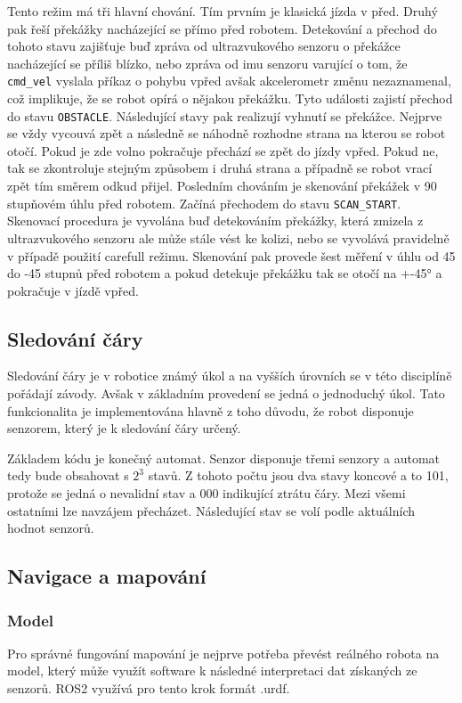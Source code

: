 Tento režim má tři hlavní chování. Tím prvním je klasická jízda v před. 
Druhý pak řeší překážky nacházející se přímo před robotem. Detekování a přechod do tohoto stavu zajišťuje buď zpráva od ultrazvukového senzoru o překážce nacházející se příliš blízko, nebo zpráva od imu senzoru varující o tom, že \verb|cmd_vel| vyslala příkaz o pohybu vpřed avšak akcelerometr změnu nezaznamenal, což implikuje, že se robot opírá o nějakou překážku. Tyto události zajistí přechod do stavu \verb|OBSTACLE|. Následující stavy pak realizují vyhnutí se překážce. Nejprve se vždy vycouvá zpět a následně se náhodně rozhodne strana na kterou se robot otočí. Pokud je zde volno pokračuje přechází se zpět do jízdy vpřed. Pokud ne, tak se zkontroluje stejným způsobem i druhá strana a případně se robot vrací zpět tím směrem odkud přijel.
Posledním chováním je skenování překážek v 90 stupňovém úhlu před robotem. Začíná přechodem do stavu \verb|SCAN_START|. Skenovací procedura je vyvolána buď detekováním překážky, která zmizela z ultrazvukového senzoru ale může stále vést ke kolizi, nebo se vyvolává pravidelně v případě použití carefull režimu. Skenování pak provede šest měření v úhlu od 45 do -45 stupnů před robotem a pokud detekuje překážku tak se otočí na +-45° a pokračuje v jízdě vpřed.

\subsection*{Sledování čáry}
Sledování čáry je v robotice známý úkol a na vyšších úrovních se v této disciplíně pořádají závody. Avšak v základním provedení se jedná o jednoduchý úkol. Tato funkcionalita je implementována hlavně z toho důvodu, že robot disponuje senzorem, který je k sledování čáry určený.

Základem kódu je konečný automat. Senzor disponuje třemi senzory a automat tedy bude obsahovat s $2^3$ stavů. Z tohoto počtu jsou dva stavy koncové a to 101, protože se jedná o nevalidní stav a 000 indikující ztrátu čáry. Mezi všemi ostatními lze navzájem přecházet. Následující stav se volí podle aktuálních hodnot senzorů.

\subsection*{Navigace a mapování}


\subsubsection*{Model}
Pro správné fungování mapování je nejprve potřeba převést reálného robota na model, který může využít software k následné interpretaci dat získaných ze senzorů. ROS2 využívá pro tento krok formát .urdf.

